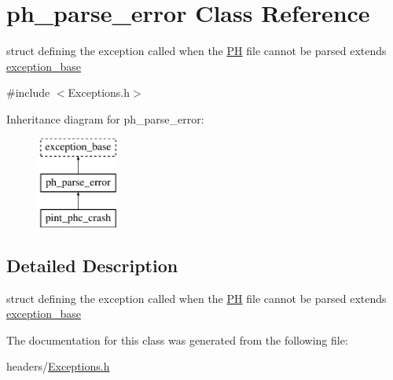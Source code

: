 \hypertarget{structph__parse__error}{\section{ph\-\_\-parse\-\_\-error \-Class \-Reference}
\label{structph__parse__error}
}


struct defining the exception called when the \hyperlink{class_p_h}{\-P\-H} file cannot be parsed extends \hyperlink{structexception__base}{exception\-\_\-base}  




{\ttfamily \#include $<$\-Exceptions.\-h$>$}

\-Inheritance diagram for ph\-\_\-parse\-\_\-error\-:\begin{figure}[H]
\begin{center}
\leavevmode
\includegraphics[height=3.000000cm]{structph__parse__error}
\end{center}
\end{figure}


\subsection{\-Detailed \-Description}
struct defining the exception called when the \hyperlink{class_p_h}{\-P\-H} file cannot be parsed extends \hyperlink{structexception__base}{exception\-\_\-base} 

\-The documentation for this class was generated from the following file\-:\begin{DoxyCompactItemize}
\item 
headers/\hyperlink{_exceptions_8h}{\-Exceptions.\-h}\end{DoxyCompactItemize}
